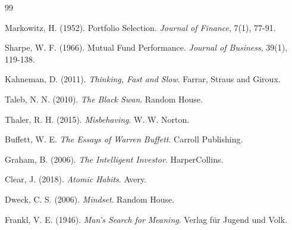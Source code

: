 \documentclass[12pt,a4paper]{article}
\begin{document}
\newpage
\begin{thebibliography}{99}

Markowitz, H. (1952). Portfolio Selection. \textit{Journal of Finance}, 7(1), 77-91.

Sharpe, W. F. (1966). Mutual Fund Performance. \textit{Journal of Business}, 39(1), 119-138.

Kahneman, D. (2011). \textit{Thinking, Fast and Slow}. Farrar, Straus and Giroux.

Taleb, N. N. (2010). \textit{The Black Swan}. Random House.

Thaler, R. H. (2015). \textit{Misbehaving}. W. W. Norton.

Buffett, W. E. \textit{The Essays of Warren Buffett}. Carroll Publishing.

Graham, B. (2006). \textit{The Intelligent Investor}. HarperCollins.

Clear, J. (2018). \textit{Atomic Habits}. Avery.

Dweck, C. S. (2006). \textit{Mindset}. Random House.

Frankl, V. E. (1946). \textit{Man's Search for Meaning}. Verlag für Jugend und Volk.

\end{thebibliography}
\end{document}
